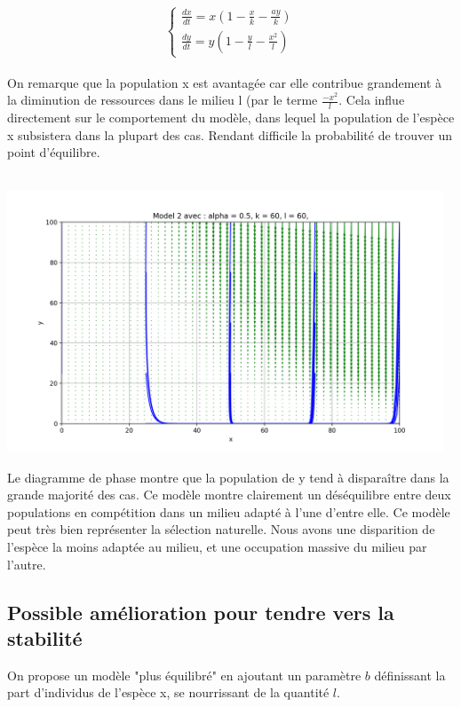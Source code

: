 \documentclass{article}
\begin{document}
\begin{equation*}
\tag{S}
\left\{
\begin{array}{ll}
    \frac{dx}{dt} =  x(1 - \frac{x}{k} - \frac{a y}{k}) \\
    \frac{dy}{dt} = y(1- \frac{y}{l} - \frac{x^{2}}{l})
\end{array}
\right.
\end{equation*}\\

On remarque que la population x est avantagée car elle contribue grandement à la diminution de ressources dans le milieu l (par le terme $\frac{-x^2}{l}$. Cela influe directement sur le comportement du modèle, dans lequel la population de l'espèce x subsistera dans la plupart des cas. Rendant difficile la probabilité de trouver un point d'équilibre. \\\\

\begin{center}
    \includegraphics[width = 13cm]{../img/Diagramme Phase Model_2.png}
\end{center}
Le diagramme de phase montre que la population de y tend à disparaître dans la grande majorité des cas. Ce modèle montre clairement un déséquilibre entre deux populations en compétition dans un milieu adapté à l'une d'entre elle. Ce modèle peut très bien représenter la sélection naturelle. Nous avons une disparition de l'espèce la moins adaptée au milieu, et une occupation massive du milieu par l'autre.

\subsection{Possible amélioration pour tendre vers la stabilité}
On propose un modèle "plus équilibré" en ajoutant un paramètre $b$ définissant la part d'individus de l'espèce x, se nourrissant de la quantité $l$.
\end{document}
